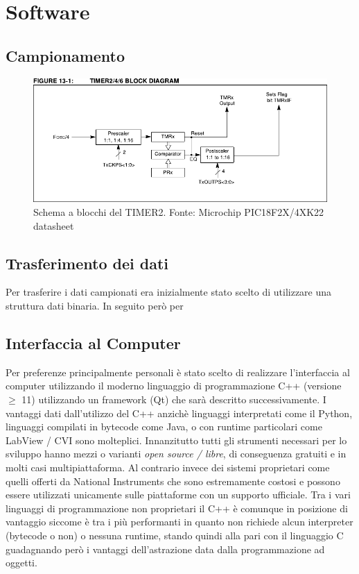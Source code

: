 \chapter{Software}
\section{Campionamento}
\begin{figure}[H] \centering
    \includegraphics[width=.9\linewidth]{figures/timer2-block-diagram}
    \caption{
        Schema a blocchi del TIMER2. Fonte: Microchip PIC18F2X/4XK22 datasheet
        \label{fig:timer2-diagram}
    }
\end{figure}

\section{Trasferimento dei dati}
Per trasferire i dati campionati era inizialmente stato scelto di utilizzare
una struttura dati binaria. In seguito per\`o per 

\section{Interfaccia al Computer}
Per preferenze principalmente personali \`e stato scelto di realizzare
l'interfaccia al computer utilizzando il moderno linguaggio di programmazione
C++ (versione \(\geq\) 11) utilizzando un framework (Qt) che sar\`a descritto
successivamente.  I vantaggi dati dall'utilizzo del C++ anzich\`e linguaggi
interpretati come il Python, linguaggi compilati in bytecode come Java, o con
runtime particolari come LabView / CVI sono molteplici. Innanzitutto tutti gli
strumenti necessari per lo sviluppo hanno mezzi o varianti \emph{open source /
libre}, di conseguenza gratuiti e in molti casi multipiattaforma. Al contrario
invece dei sistemi proprietari come quelli offerti da National Instruments che
sono estremamente costosi e possono essere utilizzati unicamente sulle
piattaforme con un supporto ufficiale.  Tra i vari linguaggi di programmazione
non proprietari il C++ \`e comunque in posizione di vantaggio siccome \`e tra
i pi\`u performanti in quanto non richiede alcun interpreter (bytecode o non)
o nessuna runtime, stando quindi alla pari con il linguaggio C guadagnando
per\`o i vantaggi dell'astrazione data dalla programmazione ad oggetti.

